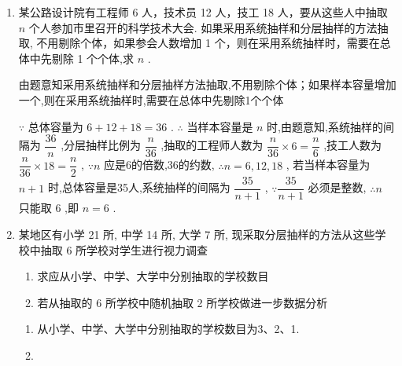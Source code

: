\begin{enumerate}
    \item 某公路设计院有工程师 6 人，技术员 12 人，技工 18 人，要从这些人中抽取 $n$ 个人参加市里召开的科学技术大会. 如果采用系统抽样和分层抽样的方法抽取, 不用剔除个体，如果参会人数增加 1 个，则在采用系统抽样时，需要在总体中先剔除 1 个个体,求 $n$ .
    \begin{jieda}
        由题意知采用系统抽样和分层抽样方法抽取,不用剔除个体；如果样本容量增加一个,则在采用系统抽样时,需要在总体中先剔除1个个体
                
        $\because$ 总体容量为 $6 + {12} + {18} = {36}$ .
        $\therefore$ 当样本容量是 $n$ 时,由题意知,系统抽样的间隔为 $\dfrac{36}{n}$ ,分层抽样比例为 $\dfrac{n}{36}$ ,抽取的工程师人数为 $\dfrac{n}{36} \times  6 = \dfrac{n}{6}$ ,技工人数为 $\dfrac{n}{36} \times  {18} = \dfrac{n}{2}$ ,
        $\because n$ 应是6的倍数,36的约数,
        $\therefore n = 6,{12},{18}$ ,
        若当样本容量为 $n + 1$ 时,总体容量是35人,系统抽样的间隔为 $\dfrac{35}{n + 1}$ ,
        $\because \dfrac{35}{n + 1}$ 必须是整数,
        $\therefore n$ 只能取 6 ,即 $n = 6$ .
    \end{jieda}
    
    \item 某地区有小学 21 所, 中学 14 所, 大学 7 所, 现采取分层抽样的方法从这些学校中抽取 6 所学校对学生进行视力调查
    \begin{enumerate}
        \item 求应从小学、中学、大学中分别抽取的学校数目
        \item 若从抽取的 6 所学校中随机抽取 2 所学校做进一步数据分析
    \end{enumerate}
    \begin{jieda}
        \begin{enumerate}
            \item 从小学、中学、大学中分别抽取的学校数目为3、2、1.
            \item {}
\end{enumerate}
\end{jieda}
\end{enumerate}
